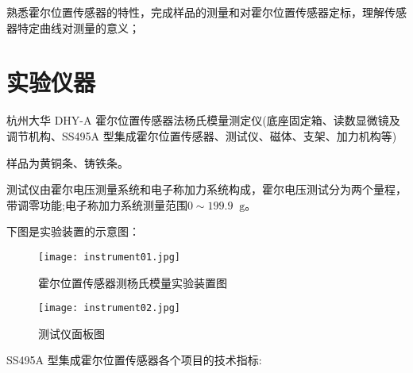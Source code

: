 \documentclass[11pt]{article}
\newcommand*{\unit}[1]{\mathop{}\!\mathrm{#1}}
\begin{document}
熟悉霍尔位置传感器的特性，完成样品的测量和对霍尔位置传感器定标，理解传感器特定曲线对测量的意义；

\section{实验仪器}

杭州大华 DHY-A 霍尔位置传感器法杨氏模量测定仪(底座固定箱、读数显微镜及调节机构、SS495A 型集成霍尔位置传感器、测试仪、磁体、支架、加力机构等)

样品为黄铜条、铸铁条。

测试仪由霍尔电压测量系统和电子称加力系统构成，霍尔电压测试分为两个量程，带调零功能;电子称加力系统测量范围$0 \sim 199.9\unit{g}$。

下图是实验装置的示意图：

\begin{figure}[H]
    \centering
    \texttt{[image: instrument01.jpg]}
    \caption{霍尔位置传感器测杨氏模量实验装置图}
\end{figure}
    
\begin{figure}[H]
    \centering
    \texttt{[image: instrument02.jpg]}
    \caption{测试仪面板图}
\end{figure}

SS495A 型集成霍尔位置传感器各个项目的技术指标: 
\end{document}
